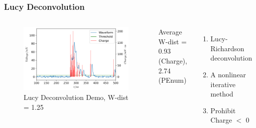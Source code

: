 \documentclass{beamer}
\begin{document}
\begin{frame}
\frametitle{Lucy Deconvolution}
\begin{columns}
\begin{figure}
    \centering
    \caption{Lucy Deconvolution Demo, W-dist = 1.25}
    \includegraphics[width=1.0\linewidth]{img/lucyddm.png}
\end{figure}
\vspace{-4mm}
\begin{center}
    Average W-dist = 0.93 (Charge), 2.74 (PEnum)
\end{center}
\begin{enumerate}
    \item Lucy-Richardson deconvolution
    \item A nonlinear iterative method
    \item Prohibit Charge $<$ 0
\end{enumerate}
\end{columns}
\end{frame}
\end{document}
